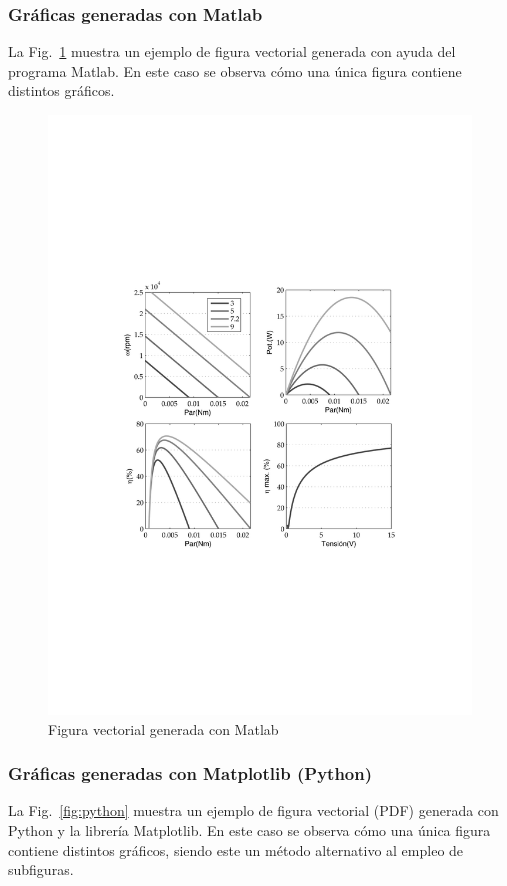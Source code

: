 \documentclass[11pt,a4paper]{article}
\begin{document}
\newpage
\subsubsection{Gráficas generadas con Matlab}
La Fig.~\ref{fig:matlabGrafs} muestra un ejemplo de figura vectorial generada con ayuda del programa Matlab. En este caso se observa cómo una única figura contiene distintos gráficos.

\begin{figure}[hbt]
	\centering
	\includegraphics[width=0.8\linewidth]{matlabGrafs} 
	\caption[Gráfico de Matlab]{Figura vectorial generada con Matlab}
	\label{fig:matlabGrafs}
\end{figure}



\newpage
\subsubsection{Gráficas generadas con Matplotlib (Python)}
La Fig.~\ref{fig:python} muestra un ejemplo de figura vectorial (PDF) generada con Python y la librería \textsf{Matplotlib}. En este caso se observa cómo una única figura contiene distintos gráficos, siendo este un método alternativo al empleo de subfiguras.
\end{document}
